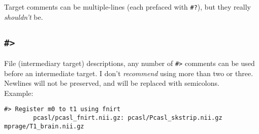 \documentclass[oneside,11pt]{article}
\begin{document}
	Target comments can be multiple-lines (each prefaced with \texttt{\#?}), but they really \textit{shouldn't} be.
	
	\subsection{\texttt{\#>}}

	File (intermediary target) descriptions, any number of \texttt{\#>} comments can be used before an intermediate target. I don't \textit{recommend} using more than two or three. Newlines will not be preserved, and will be replaced with semicolons. \\ 
	Example: 
	\begin{lstlisting}[basicstyle=\ttfamily,gobble=16,breaklines=true]
		#> Register m0 to t1 using fnirt
		pcasl/pcasl_fnirt.nii.gz: pcasl/Pcasl_skstrip.nii.gz mprage/T1_brain.nii.gz
	\end{lstlisting}
\end{document}
